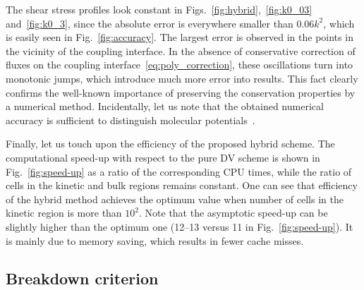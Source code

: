 \documentclass{elsarticle} %
\begin{document}
The shear stress profiles look constant in Figs.~\ref{fig:hybrid},~\ref{fig:k0_03} and~\ref{fig:k0_3},
since the absolute error is everywhere smaller than \(0.06k^2\), which is easily seen in Fig.~\ref{fig:accuracy}.
The largest error is observed in the points in the vicinity of the coupling interface.
In the absence of conservative correction of fluxes on the coupling interface~\eqref{eq:poly_correction},
these oscillations turn into monotonic jumps, which introduce much more error into results.
This fact clearly confirms the well-known importance of preserving the conservation properties by a numerical method.
Incidentally, let us note that the obtained numerical accuracy is sufficient
to distinguish molecular potentials~\cite{Sharipov2013, Su2018}.


Finally, let us touch upon the efficiency of the proposed hybrid scheme.
The computational speed-up with respect to the pure DV scheme is shown in Fig.~\ref{fig:speed-up} as a ratio of the corresponding CPU times,
while the ratio of cells in the kinetic and bulk regions remains constant.
One can see that efficiency of the hybrid method achieves the optimum value when number of cells in the kinetic region is more than $10^2$.
Note that the asymptotic speed-up can be slightly higher than the optimum one (12--13 versus 11 in Fig.~\ref{fig:speed-up}).
It is mainly due to memory saving, which results in fewer cache misses.

\subsection{Breakdown criterion}
\end{document}
